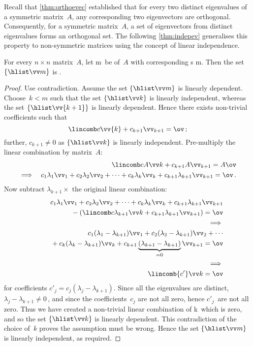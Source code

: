Recall that \autoref{thm:orthoevec} established that for every two distinct {eigenvalue}s of a symmetric matrix~\(A\), any corresponding two {eigenvector}s are {orthogonal}.
Consequently, for a symmetric matrix~\(A\), a set of eigenvectors from distinct eigenvalues forms an orthogonal set.
The following \autoref{thm:indepev} generalises this property to non-symmetric matrices using the concept of linear independence.


\begin{theorem} \label{thm:indepev}
For every \(n\times n\) matrix~\(A\), let \hlist\lambda m\ be  of~\(A\) with corresponding s \hlist\vv m.
Then the set \(\{\hlist \vv m\}\) is .
\end{theorem}
\begin{proof} 
Use contradiction.
Assume the set \(\{\hlist \vv m\}\) is linearly dependent.
Choose~\(k<m\) such that the set \(\{\hlist\vv k\}\) is linearly independent, whereas the set \(\{\hlist\vv{k+1}\}\) is linearly dependent.
Hence there exists non-trivial coefficients such that 
\begin{equation*}
\lincomb c\vv{k}+c_{k+1}\vv_{k+1}=\ov\,;
\end{equation*}
further, \(c_{k+1}\neq0\) as \(\{\hlist\vv k\}\) is linearly independent.
Pre-multiply the linear combination by matrix~\(A\):
\begin{eqnarray*}&&
\lincomb c{A\vv}k+c_{k+1}A\vv_{k+1}=A\ov
\\\implies&&
c_1\lambda_1\vv_1+c_2\lambda_2\vv_2+\cdots+c_k\lambda_k\vv_k+c_{k+1}\lambda_{k+1}\vv_{k+1}=\ov\,.
\end{eqnarray*}
Now subtract \(\lambda_{k+1}\times\) the original linear combination:
\begin{eqnarray*}&&
\phantom{{}+(}c_1\lambda_1\vv_1+c_2\lambda_2\vv_2+\cdots+c_k\lambda_k\vv_k+c_{k+1}\lambda_{k+1}\vv_{k+1}
\\&&{}
-\left(\lincomb c{\lambda_{k+1}\vv}{k}
+c_{k+1}\lambda_{k+1}\vv_{k+1}\right)=\ov
\\&&\implies\\&&
c_1(\lambda_1-\lambda_{k+1})\vv_1+c_2(\lambda_2-\lambda_{k+1})\vv_2+\cdots
\\&&{}
+c_k(\lambda_k-\lambda_{k+1})\vv_k
+c_{k+1}\underbrace{(\lambda_{k+1}-\lambda_{k+1})}_{=0}\vv_{k+1}=\ov
\\&&\implies\\&&
\lincomb{c'}\vv k=\ov
\end{eqnarray*}
for coefficients \(c'_j=c_j(\lambda_j-\lambda_{k+1})\).
Since all the eigenvalues are distinct, \(\lambda_j-\lambda_{k+1}\neq0\)\,, and since the coefficients~\(c_j\) are not all zero, hence \(c'_j\)~are not all zero.
Thus we have created a non-trivial linear combination of \hlist \vv k\ which is zero, and so the set \(\{\hlist\vv k\}\) is linearly dependent.
This contradiction of the choice of~\(k\) proves the assumption must be wrong.
Hence the set \(\{\hlist \vv m\}\) is linearly independent, as required.
\end{proof}



